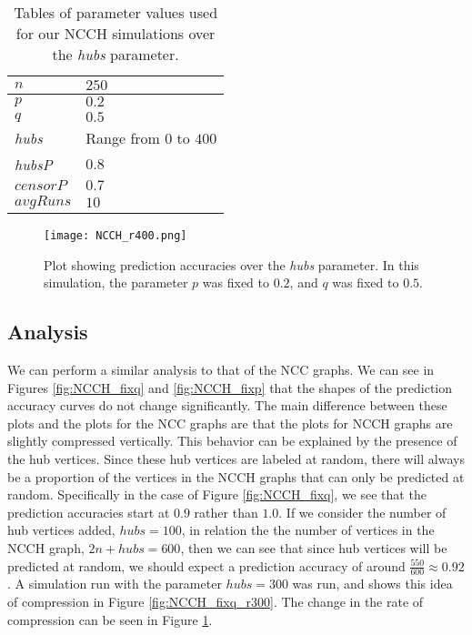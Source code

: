 \begin{table}[H]
\centering
\begin{tabular}{|l|l|}
\hline
$n$ & $250$ \\ \hline
$p$ & $0.2$\\ \hline
$q$ & $0.5$\\ \hline
\textit{hubs} & Range from $0$ to $400$\\ \hline
\textit{hubsP} & $0.8$\\ \hline
$censorP$ & $0.7$\\ \hline
$avgRuns$ & $10$\\ \hline
\end{tabular}
\caption{Tables of parameter values used for our NCCH simulations over the \textit{hubs} parameter.}
\label{table:NCCH-params-r}
\end{table}

\begin{figure}[H]
\centering
\texttt{[image: NCCH\_r400.png]}
\caption{Plot showing prediction accuracies over the \textit{hubs} parameter. In this simulation, the parameter $p$ was fixed to $0.2$, and $q$ was fixed to $0.5$.}
\label{fig:NCCH_r400}
\end{figure}

\subsection{Analysis}
We can perform a similar analysis to that of the NCC graphs. We can see
in Figures \ref{fig:NCCH_fixq} and \ref{fig:NCCH_fixp} that the shapes of 
the prediction accuracy curves do not change significantly. The main
difference between these plots and the plots for the NCC graphs are that
the plots for NCCH graphs are slightly compressed vertically. This behavior
can be explained by the presence of the hub vertices. Since these hub
vertices are labeled at random, there will always be a proportion of the
vertices in the NCCH graphs that can only be predicted at random. 
Specifically in the case of Figure \ref{fig:NCCH_fixq}, we see that the
prediction accuracies start at $0.9$ rather than $1.0$. If we consider the
number of hub vertices added, $hubs=100$, in relation the the number of
vertices in the NCCH graph, $2n + hubs = 600$, then we can see that since
hub vertices will be predicted at random, we should expect a prediction
accuracy of around $\frac{550}{600} \approx 0.92$. A simulation run with
the parameter $hubs=300$ was run, and shows this idea of compression in
Figure \ref{fig:NCCH_fixq_r300}. The change in the rate of compression can
be seen in Figure \ref{fig:NCCH_r400}.

